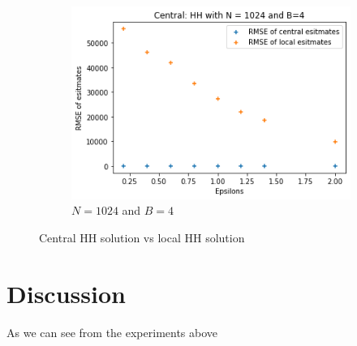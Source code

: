 \documentclass[11pt]{article}
\theoremstyle{definition}
\begin{document}
\begin{figure}[H]
\begin{subfigure}{.3\textwidth}
  \includegraphics[width=\linewidth]{figures/cen_vs_loc/hh/hh_beat_flat=1024_B=4.png}
  \caption{$N=1024$ and $B=4$}
  \label{fig:hh_vs1024}
\end{subfigure}
\caption{Central HH solution vs local HH solution}
\label{fig:hhhh_flat}
\end{figure}



\section{Discussion}
As we can see from the experiments above
\end{document}
